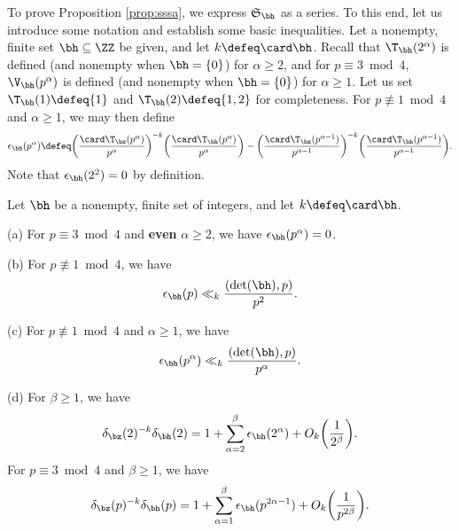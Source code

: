 \documentclass[12pt, reqno, twoside, letterpaper]{amsart}
\begin{document}
To prove Proposition \ref{prop:sssa}, we express 
$\mathfrak{S}_{\bh}$ as a series.
%
To this end, let us introduce some notation and establish some 
basic inequalities.
%
Let a nonempty, finite set $\bh \subseteq \ZZ$ be given, and let 
$k \defeq \card \bh$.
%
Recall that $\T_{\bh}(2^{\alpha})$ is defined (and nonempty when 
$\bh = \{0\}$) for $\alpha \ge 2$, and for $p \equiv 3 \bmod 4$, 
$\V_{\bh}(p^{\alpha})$ is defined (and nonempty when 
$\bh = \{0\}$) for $\alpha \ge 1$.
%
Let us set $\T_{\bh}(1) \defeq \{1\}$ and 
$\T_{\bh}(2) \defeq \{1,2\}$ for completeness.
%
For $p \not\equiv 1 \bmod 4$ and $\alpha \ge 1$, we may then 
define 
\begin{equation}
 \label{eq:defiota}
 \epsilon_{\bh}(p^{\alpha})
  \defeq 
   \bigg(\frac{\card \T_{\bz}(p^{\alpha})}{p^{\alpha}}\bigg)^{-k}
    \bigg(\frac{\card \T_{\bh}(p^{\alpha})}{p^{\alpha}}\bigg)
  -
     \bigg(\frac{\card \T_{\bz}(p^{\alpha - 1})}{p^{\alpha - 1}}\bigg)^{-k}
      \bigg(\frac{\card \T_{\bh}(p^{\alpha - 1})}{p^{\alpha - 1}}\bigg). 
\end{equation}
%
Note that $\epsilon_{\bh}(2^2) = 0$ by definition.

\begin{lemma}
 \label{lem:iotah}
%
Let $\bh$ be a nonempty, finite set of integers, and let 
$k \defeq \card \bh$.

\textup{(}a\textup{)}
%
For $p \equiv 3 \bmod 4$ and {\bfseries even} $\alpha \ge 2$, we 
have $\epsilon_{\bh}(p^{\alpha}) = 0$.

\textup{(}b\textup{)}
%
For $p \not\equiv 1 \bmod 4$, we have
\begin{equation}
 \label{eq:iotlem1}
  \epsilon_{\bh}(p)
   \ll_k
    \frac{(\det(\bh),p)}{p^2}.
\end{equation}

\textup{(}c\textup{)}
%
For $p \not\equiv 1 \bmod 4$ and $\alpha \ge 1$, we have 
\begin{equation}
 \label{eq:iotlem2}
  \epsilon_{\bh}(p^{\alpha})
   \ll_k 
    \frac{(\det(\bh),p)}{p^\alpha}.
\end{equation}

\textup{(}d\textup{)}
%
For $\beta \ge 1$, we have  
\begin{equation}
 \label{eq:iotlem3}
   \delta_{\bz}(2)^{-k}\delta_{\bh}(2)  
   =
    1 + \sum_{\alpha = 2}^{\beta} \epsilon_{\bh}(2^{\alpha})
      + O_k\bigg(\frac{1}{2^{\beta}}\bigg).
\end{equation}
%
For $p \equiv 3 \bmod 4$ and $\beta \ge 1$, we have 
\begin{equation}
 \label{eq:iotlem4}
   \delta_{\bz}(p)^{-k}\delta_{\bh}(p)  
   =
    1 + \sum_{\alpha = 1}^{\beta} \epsilon_{\bh}(p^{2\alpha - 1})
      + O_k\bigg(\frac{1}{p^{2\beta}}\bigg).
\end{equation}
\end{lemma}
\end{document}
